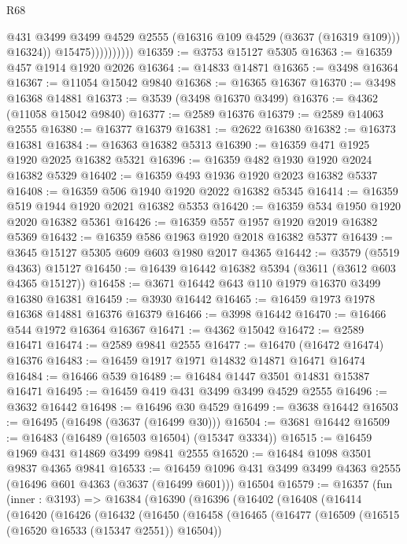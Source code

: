 \begin{lexlean}{R68}
\begin{coremodule}
                            @431
                            @3499
                            @3499
                            @4529
                            @2555
                            (@16316 @109 @4529 (@3637 (@16319 @109)))
                            @16324))
                        @15475))))))))))
@16359 := @3753 @15127 @5305
@16363 := @16359 @457 @1914 @1920 @2026
@16364 := @14833 @14871
@16365 := @3498 @16364
@16367 := @11054 @15042 @9840
@16368 := @16365 @16367
@16370 := @3498 @16368 @14881
@16373 := @3539 (@3498 @16370 @3499)
@16376 := @4362 (@11058 @15042 @9840)
@16377 := @2589 @16376
@16379 := @2589 @14063 @2555
@16380 := @16377 @16379
@16381 := @2622 @16380
@16382 := @16373 @16381
@16384 := @16363 @16382 @5313
@16390 := @16359 @471 @1925 @1920 @2025 @16382 @5321
@16396 := @16359 @482 @1930 @1920 @2024 @16382 @5329
@16402 := @16359 @493 @1936 @1920 @2023 @16382 @5337
@16408 := @16359 @506 @1940 @1920 @2022 @16382 @5345
@16414 := @16359 @519 @1944 @1920 @2021 @16382 @5353
@16420 := @16359 @534 @1950 @1920 @2020 @16382 @5361
@16426 := @16359 @557 @1957 @1920 @2019 @16382 @5369
@16432 := @16359 @586 @1963 @1920 @2018 @16382 @5377
@16439 := @3645 @15127 @5305 @609 @603 @1980 @2017 @4365
@16442 := @3579 (@5519 @4363) @15127
@16450 := @16439 @16442 @16382 @5394 (@3611 (@3612 @603 @4365 @15127))
@16458 := @3671 @16442 @643 @110 @1979 @16370 @3499 @16380 @16381
@16459 := @3930 @16442
@16465 := @16459 @1973 @1978 @16368 @14881 @16376 @16379
@16466 := @3998 @16442
@16470 := @16466 @544 @1972 @16364 @16367
@16471 := @4362 @15042
@16472 := @2589 @16471
@16474 := @2589 @9841 @2555
@16477 := @16470 (@16472 @16474) @16376
@16483 := @16459 @1917 @1971 @14832 @14871 @16471 @16474
@16484 := @16466 @539
@16489 := @16484 @1447 @3501 @14831 @15387 @16471
@16495 := @16459 @419 @431 @3499 @3499 @4529 @2555
@16496 := @3632 @16442
@16498 := @16496 @30 @4529
@16499 := @3638 @16442
@16503 := @16495 (@16498 (@3637 (@16499 @30)))
@16504 := @3681 @16442
@16509 := @16483 (@16489 (@16503 @16504) (@15347 @3334))
@16515 := @16459 @1969 @431 @14869 @3499 @9841 @2555
@16520 := @16484 @1098 @3501 @9837 @4365 @9841
@16533 := @16459 @1096 @431 @3499 @3499 @4363 @2555 (@16496 @601 @4363 (@3637 (@16499 @601))) @16504
@16579 := @16357
    (fun (inner : @3193) =>
    @16384
      (@16390
        (@16396
          (@16402
            (@16408
              (@16414
                (@16420
                  (@16426
                    (@16432
                      (@16450
                        (@16458
                          (@16465
                            (@16477
                              (@16509 (@16515 (@16520 @16533 (@15347 @2551)) @16504))

\end{coremodule}
\end{lexlean}
